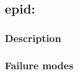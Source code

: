 \clearpage
{}
{}
\label{vars:epid}
\subsection*{epid: }

\subsubsection*{Description}

\subsubsection*{Failure modes}

